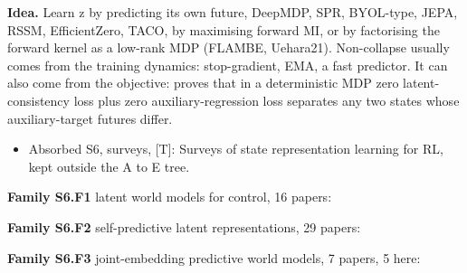 \documentclass[10pt]{article}
\newcommand{\memb}[1]{\par\smallskip\textbf{#1}\quad}
\begin{document}
\textbf{Idea.} Learn z by predicting its own future, DeepMDP, SPR, BYOL-type, JEPA, RSSM, EfficientZero, TACO, by maximising forward MI, or by factorising the forward kernel as a low-rank MDP (FLAMBE, Uehara21). Non-collapse usually comes from the training dynamics: stop-gradient, EMA, a fast predictor. It can also come from the objective: \citet{Yu-auxiliary25} proves that in a deterministic MDP zero latent-consistency loss plus zero auxiliary-regression loss separates any two states whose auxiliary-target futures differ.
\begin{itemize}[nosep,leftmargin=1.2em]
\item Absorbed S6, surveys, [T]: Surveys of state representation learning for RL, kept outside the A to E tree.
\end{itemize}


\memb{Family S6.F1} latent world models for control, 16 papers: {\footnotesize \citetext{\citealp{Amos-learning18}; \citealp{Watter-embed15}; \citealp{Karl-deep16}; \citealp{Hafner-dream19}; \citealp{Zhang-solar18}; \citealp{Hafner-dream20}; \citealp{Lee-stochastic19}; \citealp{Watters-cobra19}; \citealp{Hafner-mastering20}; \citealp{Okada-dreaming20}; \citealp{Deng-dreamerpro21}; \citealp{Hafner-mastering23}; \citealp{Zhou-dinowm24}; \citealp{Sobal-learning25}; \citealp{Xia-cloning25}; \citealp{Hauri-dreamercdp26}}}

\memb{Family S6.F2} self-predictive latent representations, 29 papers: {\footnotesize \citetext{\citealp{Gelada-deepmdp19}; \citealp{Schwarzer-dataefficient21}; \citealp{Guo-byolexplore22}; \citealp{Tang-understanding23}; \citealp{LeLan-bootstrapped23}; \citealp{Khetarpal-unifying24}; \citealp{Ni-bridging24}; \citealp{Voelcker-when24}; \citealp{Jaderberg-reinforcement16}; \citealp{Bellemare-geometric19}; \citealp{Ghosh-representations20}; \citealp{Guo-bootstrap20}; \citealp{Lyle-effect21}; \citealp{Nguyen-temporal21}; \citealp{Ghugare-simplifying22}; \citealp{Hansen-tdmpc22}; \citealp{Lan-generalization22}; \citealp{Fang-predictive23}; \citealp{Fujimoto-sale23}; \citealp{Hansen-tdmpc223}; \citealp{Tang-better23}; \citealp{Zhao-simplified23}; \citealp{Ishikawa-phinets24}; \citealp{Scannell-iqrl24}; \citealp{Fujimoto-generalpurpose25}; \citealp{Lawson-selfpredictive25}; \citealp{Teoh-nextlatent25}; \citealp{Jajoo-regularized26}; \citealp{Lyu-debiased26}}}

\memb{Family S6.F3} joint-embedding predictive world models, 7 papers, 5 here: {\footnotesize \citetext{\citealp{Yu-auxiliary25}; \citealp{Maes-leworldmodel26}; \citealp{Assran-selfsupervised23}; \citealp{Assran-vjepa25}; \citealp{Terver-lightweight26}}}
\end{document}
